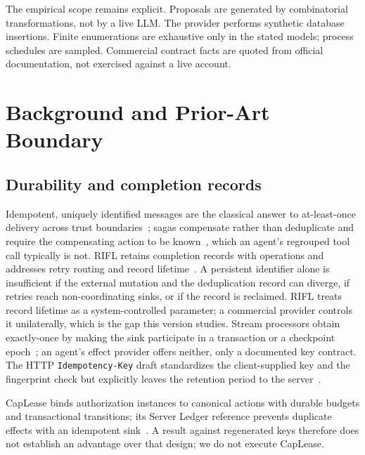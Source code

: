 \documentclass[conference,10pt]{IEEEtran}
\begin{document}
The empirical scope remains explicit. Proposals are generated by combinatorial transformations, not by a live LLM. The provider performs synthetic database insertions. Finite enumerations are exhaustive only in the stated models; process schedules are sampled. Commercial contract facts are quoted from official documentation, not exercised against a live account.

\section{Background and Prior-Art Boundary}

\subsection{Durability and completion records}
Idempotent, uniquely identified messages are the classical answer to at-least-once delivery across trust boundaries~\cite{helland2007,helland2012}; sagas compensate rather than deduplicate and require the compensating action to be known~\cite{sagas}, which an agent's regrouped tool call typically is not. RIFL retains completion records with operations and addresses retry routing and record lifetime~\cite{rifl}. A persistent identifier alone is insufficient if the external mutation and the deduplication record can diverge, if retries reach non-coordinating sinks, or if the record is reclaimed. RIFL treats record lifetime as a system-controlled parameter; a commercial provider controls it unilaterally, which is the gap this version studies. Stream processors obtain exactly-once by making the sink participate in a transaction or a checkpoint epoch~\cite{flink,kafka}; an agent's effect provider offers neither, only a documented key contract. The HTTP \texttt{Idempotency-Key} draft standardizes the client-supplied key and the fingerprint check but explicitly leaves the retention period to the server~\cite{idempotencykey}.

CapLease binds authorization instances to canonical actions with durable budgets and transactional transitions; its Server Ledger reference prevents duplicate effects with an idempotent sink~\cite{caplease}. A result against regenerated keys therefore does not establish an advantage over that design; we do not execute CapLease.
\end{document}

